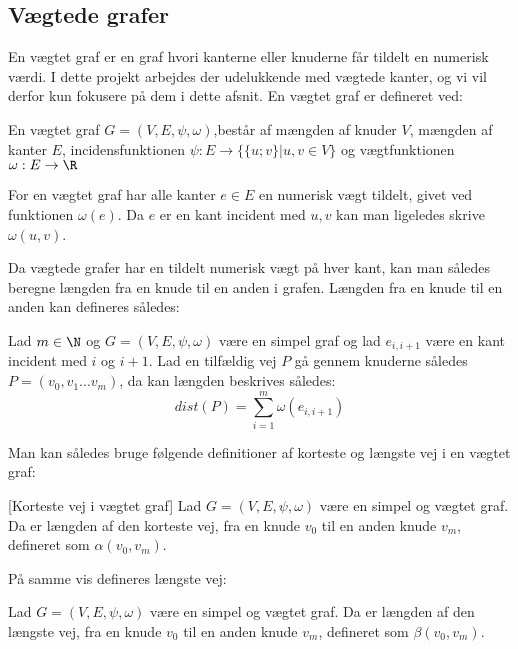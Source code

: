 \subsection{Vægtede grafer}
En vægtet graf er en graf hvori kanterne eller knuderne får tildelt en numerisk værdi. I dette projekt arbejdes der udelukkende med vægtede kanter, og vi vil derfor kun fokusere på dem i dette afsnit.
En vægtet graf er defineret ved:
\begin{defn}
En vægtet graf $G=(V,E,\psi,\omega)$,består af mængden af knuder $V$, mængden af kanter $E$, incidensfunktionen $\psi: E \rightarrow \{\{u;v\}|u,v \in V\}$ og vægtfunktionen $\omega: E \rightarrow \R$
\end{defn}


For en vægtet graf har alle kanter $e\in E$ en numerisk vægt tildelt, givet ved funktionen $\omega (e)$. Da $e$ er en kant incident med ${u,v}$ kan man  ligeledes skrive $\omega (u,v)$.


Da vægtede grafer har en tildelt numerisk vægt på hver kant, kan man således beregne længden fra en knude til en anden i grafen. Længden fra en knude til en anden kan defineres således:

\begin{defn}
Lad $m\in \N$ og $G=(V,E,\psi,\omega)$ være en simpel graf og lad $e_{i,i+1}$ være en kant incident med $i$ og $i+1$. Lad en tilfældig vej $P$ gå gennem knuderne således $P=(v_0,v_1...v_m)$, da kan længden beskrives således:
	\begin{equation*}
	dist(P)=\sum_{i=1}^{m}\omega(e_{i,i+1})
	\end{equation*}  
\end{defn}
Man kan således bruge følgende definitioner af korteste og længste vej i en vægtet graf:


\begin{defn} \label{defn:min.vej} [Korteste vej i vægtet graf]
Lad $G=(V,E,\psi,\omega)$ være en simpel og vægtet graf. Da er længden af den korteste vej, fra en knude $v_0$ til en anden knude $v_m$, defineret som $\alpha(v_0,v_m)$.
\end{defn}

På samme vis defineres længste vej:

\begin{defn} 
Lad $G=(V,E,\psi,\omega)$ være en simpel og vægtet graf. Da er længden af den længste vej, fra en knude $v_0$ til en anden knude $v_m$, defineret som $\beta(v_0,v_m)$.
\end{defn}

